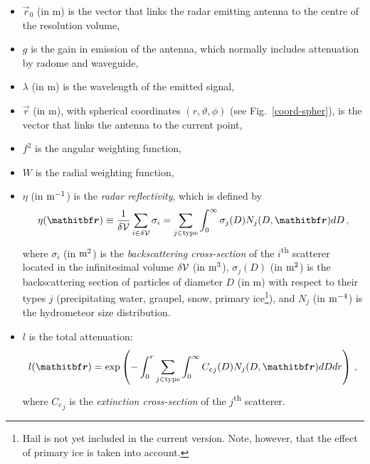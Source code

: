 \begin{itemize}
\item $\vec r_0$ (in m) is the vector that links the radar emitting antenna to the centre of the resolution volume, 
\item $g$ is the gain in emission of the antenna, which normally includes attenuation by radome and waveguide, 
\item $\lambda$ (in m) is the wavelength of the emitted signal, 
\item $\vec r$ (in m), with spherical coordinates $(r,\vartheta,\phi)$ (see Fig.~\ref{coord-spher}), is the vector that links the antenna to the current point, 
\item $f^2$ is the angular weighting function,
\item $W$ is the radial weighting function, 
\item $\eta$ (in $\rm m^{-1}$) is the \emph{radar reflectivity}, which is defined by
\begin{equation}
\eta(\vec r)\equiv\frac1{\delta\cal V}\sum_{i\in\delta\cal V}\sigma_i=\sum_{j\in\rm type}\int_0^\infty\sigma_j(D)N_j(D,\vec r)d D\,,\label{eta}
\end{equation}
where $\sigma_i$ (in $\rm m^2$) is the \emph{backscattering cross-section} of the $i$\textsuperscript{th} scatterer located in the infinitesimal volume $\delta\cal V$ (in $\rm m^3$), $\sigma_j(D)$ (in $\rm m^2$) is the backscattering section of particles of diameter $D$ (in m) with respect to their types $j$ (precipitating water, graupel, snow, primary ice\footnote{Hail is not yet included in the current version. Note, however, that the effect of primary ice is taken into account.}), and $N_j$ (in $\rm m^{-4}$) is the hydrometeor size distribution. %
\item $l$ is the total attenuation:
\begin{equation}
l({\vec r})=\exp\left(-\int_0^r\sum_{j\in\rm type}\int_0^\infty {C_e}_j(D)N_j(D,{\vec r})d Dd r\right)\,,\label{l}
\end{equation}
where ${C_e}_j$ is the \emph{extinction cross-section} of the $j$\textsuperscript{th} scatterer.
\end{itemize}


